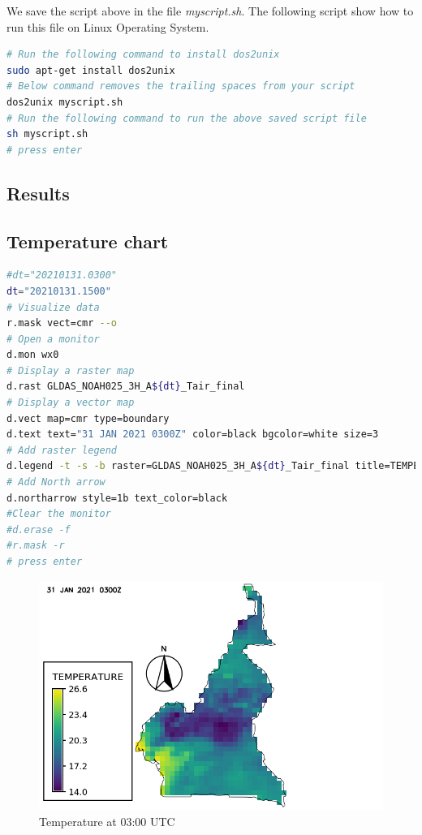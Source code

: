 We save the script above in the file \textit{myscript.sh}. The following script show how to run this file on Linux Operating System.
\begin{lstlisting}[language=Bash]
# Run the following command to install dos2unix
sudo apt-get install dos2unix
# Below command removes the trailing spaces from your script
dos2unix myscript.sh
# Run the following command to run the above saved script file
sh myscript.sh
# press enter
\end{lstlisting}
\subsection{Results}
\subsection{Temperature chart}
\begin{lstlisting}[language=Bash]
#dt="20210131.0300"
dt="20210131.1500"
# Visualize data
r.mask vect=cmr --o
# Open a monitor
d.mon wx0
# Display a raster map
d.rast GLDAS_NOAH025_3H_A${dt}_Tair_final
# Display a vector map
d.vect map=cmr type=boundary
d.text text="31 JAN 2021 0300Z" color=black bgcolor=white size=3
# Add raster legend
d.legend -t -s -b raster=GLDAS_NOAH025_3H_A${dt}_Tair_final title=TEMPERATURE title_fontsize=20 font=sans fontsize=18
# Add North arrow
d.northarrow style=1b text_color=black
#Clear the monitor
#d.erase -f
#r.mask -r
# press enter
\end{lstlisting}

\begin{figure}[H]
\begin{center}
\includegraphics[scale=0.8]{tp03.png} %
\end{center}
\caption{Temperature at 03:00 UTC}
\label{Temperature at 03:00 UTC}%
\end{figure}

